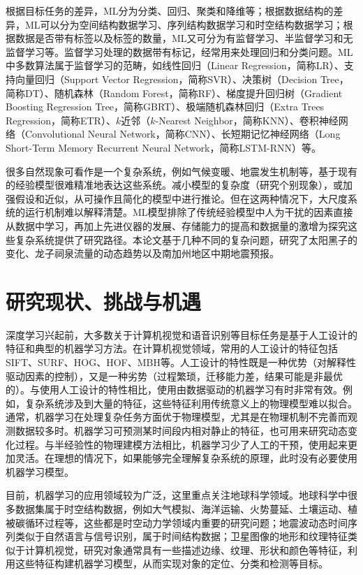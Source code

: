 根据目标任务的差异，ML分为分类、回归、聚类和降维等；根据数据结构的差异，ML可以分为空间结构数据学习、序列结构数据学习和时空结构数据学习；根据数据是否带有标签以及标签的数量，ML又可分为有监督学习、半监督学习和无监督学习等。监督学习处理的数据带有标记，经常用来处理回归和分类问题。ML中多数算法属于监督学习的范畴，如线性回归（Linear Regression，简称LR）、支持向量回归（Support Vector Regression，简称SVR）、决策树（Decision Tree，简称DT）、随机森林（Random Forest，简称RF）、梯度提升回归树（Gradient Boosting Regression Tree，简称GBRT）、极端随机森林回归（Extra Trees Regression，简称ETR）、$k$近邻（$k$-Nearest Neighbor，简称KNN）、卷积神经网络（Convolutional Neural Network，简称CNN）、长短期记忆神经网络（Long Short-Term Memory Recurrent Neural Network，简称LSTM-RNN）等。

很多自然现象可看作是一个复杂系统，例如气候变暖、地震发生机制等\citep{fan2021statistical}，基于现有的经验模型很难精准地表达这些系统。减小模型的复杂度（研究个别现象），或加强假设和近似，从可操作且简化的模型中进行推论。但在这两种情况下，大尺度系统的运行机制难以解释清楚。ML模型排除了传统经验模型中人为干扰的因素直接从数据中学习，再加上先进仪器的发展、存储能力的提高和数据量的激增为探究这些复杂系统提供了研究路径。本论文基于几种不同的复杂问题，研究了太阳黑子的变化、龙子祠泉流量的动态趋势以及南加州地区中期地震预报。

\section{研究现状、挑战与机遇}\label{sec:intro_veiw}

深度学习兴起前，大多数关于计算机视觉和语音识别等目标任务是基于人工设计的特征和典型的机器学习方法。在计算机视觉领域，常用的人工设计的特征包括SIFT、SURF、HOG、HOF、MBH等。人工设计的特性既是一种优势（对解释性驱动因素的控制），又是一种劣势（过程繁琐，迁移能力差，结果可能是非最优的）。与使用人工设计的特性相比，使用由数据驱动的机器学习有时非常有效。例如，复杂系统涉及到大量的特征，这些特征利用传统意义上的物理模型难以拟合。通常，机器学习在处理复杂任务方面优于物理模型，尤其是在物理机制不完善而观测数据较多时。机器学习可预测某时间段内相对静止的特征，也可用来研究动态变化过程。与半经验性的物理建模方法相比，机器学习少了人工的干预，使用起来更加灵活。在理想的情况下，如果能够完全理解复杂系统的原理，此时没有必要使用机器学习模型。

目前，机器学习的应用领域较为广泛，这里重点关注地球科学领域。地球科学中很多数据集属于时空结构数据，例如大气模拟、海洋运输、火势蔓延、土壤运动、植被碳循环过程等，这些都是时空动力学领域内重要的研究问题\citep{mathieu2015deep,oh2015action}；地震波动态时间序列类似于自然语言与信号识别，属于时间结构数据\citep{perol2018convolutional,devries2018deep,rouet2017machine}；卫星图像的地形和纹理特征类似于计算机视觉，研究对象通常具有一些描述边缘、纹理、形状和颜色等特征，利用这些特征构建机器学习模型，从而实现对象的定位、分类和检测等目标\citep{lee1990neural}。

